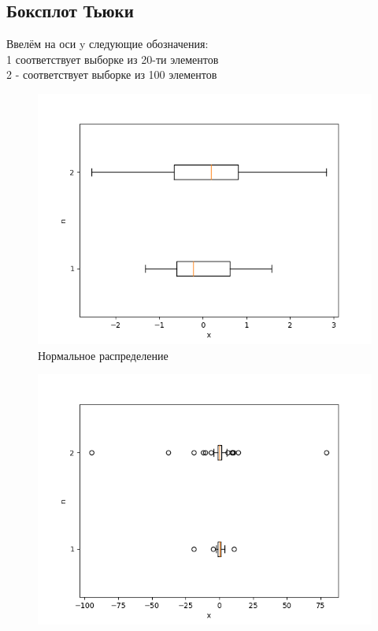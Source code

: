 \documentclass[a4]{article}
\begin{document}
			\subsection{Боксплот Тьюки}
			Ввелём на оси y следующие обозначения:\\
			1 соответствует выборке из 20-ти элементов\\
			2 - соответствует выборке из 100 элементов\\
			\begin{center}
				
				\begin{figure}[h]
					\includegraphics[width=\textwidth]{normal.png} 
					\caption[Нормальное распределение]{Нормальное распределение}
				\end{figure}
				\newpage
				\begin{figure}[h]
					\includegraphics[width=\textwidth]{cauchy.png}

\end{figure}
\end{center}
\end{document}

